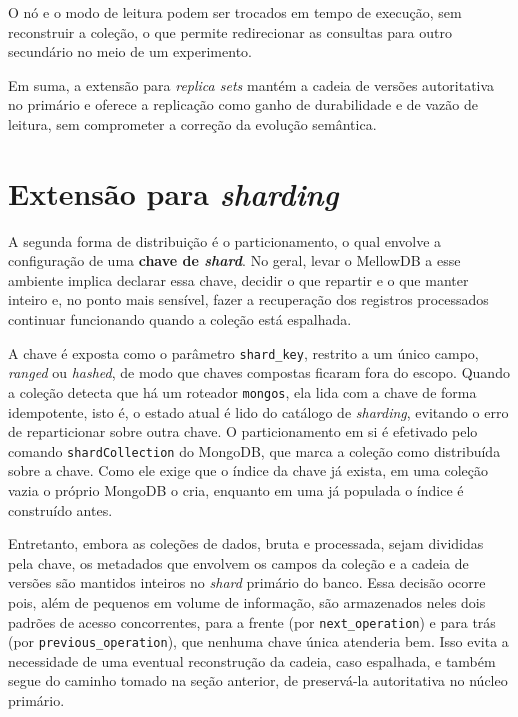 O nó e o modo de leitura podem ser trocados em tempo de execução, sem reconstruir a coleção, o que permite redirecionar as consultas para outro secundário no meio de um experimento.

Em suma, a extensão para \textit{replica sets} mantém a cadeia de versões autoritativa no primário e oferece a replicação como ganho de durabilidade e de vazão de leitura, sem comprometer a correção da evolução semântica.

\section{Extensão para \textit{sharding}}
\label{sec:ext-sharding}

A segunda forma de distribuição é o particionamento, o qual envolve a configuração de uma \textbf{chave de \textit{shard}}. No geral, levar o MellowDB a esse ambiente implica declarar essa chave, decidir o que repartir e o que manter inteiro e, no ponto mais sensível, fazer a recuperação dos registros processados continuar funcionando quando a coleção está espalhada.

A chave é exposta como o parâmetro \texttt{shard\_key}, restrito a um único campo, \textit{ranged} ou \textit{hashed}, de modo que chaves compostas ficaram fora do escopo. Quando a coleção detecta que há um roteador \texttt{mongos}, ela lida com a chave de forma idempotente, isto é, o estado atual é lido do catálogo de \textit{sharding}, evitando o erro de reparticionar sobre outra chave. O particionamento em si é efetivado pelo comando \texttt{shardCollection} do MongoDB, que marca a coleção como distribuída sobre a chave. Como ele exige que o índice da chave já exista, em uma coleção vazia o próprio MongoDB o cria, enquanto em uma já populada o índice é construído antes.

Entretanto, embora as coleções de dados, bruta e processada, sejam divididas pela chave, os metadados que envolvem os campos da coleção e a cadeia de versões são mantidos inteiros no \textit{shard} primário do banco. Essa decisão ocorre pois, além de pequenos em volume de informação, são armazenados neles dois padrões de acesso concorrentes, para a frente (por \texttt{next\_operation}) e para trás (por \texttt{previous\_operation}), que nenhuma chave única atenderia bem. Isso evita a necessidade de uma eventual reconstrução da cadeia, caso espalhada, e também segue do caminho tomado na seção anterior, de preservá-la autoritativa no núcleo primário.

